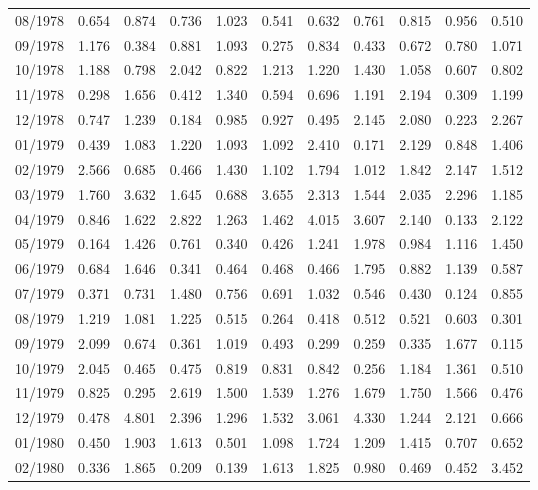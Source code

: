 \begin{tabular}{lrrrrrrrrrr}
08/1978 &  0.654 &  0.874 &  0.736 &  1.023 &  0.541 &  0.632 &  0.761 &  0.815 &  0.956 &  0.510 \\
09/1978 &  1.176 &  0.384 &  0.881 &  1.093 &  0.275 &  0.834 &  0.433 &  0.672 &  0.780 &  1.071 \\
10/1978 &  1.188 &  0.798 &  2.042 &  0.822 &  1.213 &  1.220 &  1.430 &  1.058 &  0.607 &  0.802 \\
11/1978 &  0.298 &  1.656 &  0.412 &  1.340 &  0.594 &  0.696 &  1.191 &  2.194 &  0.309 &  1.199 \\
12/1978 &  0.747 &  1.239 &  0.184 &  0.985 &  0.927 &  0.495 &  2.145 &  2.080 &  0.223 &  2.267 \\
01/1979 &  0.439 &  1.083 &  1.220 &  1.093 &  1.092 &  2.410 &  0.171 &  2.129 &  0.848 &  1.406 \\
02/1979 &  2.566 &  0.685 &  0.466 &  1.430 &  1.102 &  1.794 &  1.012 &  1.842 &  2.147 &  1.512 \\
03/1979 &  1.760 &  3.632 &  1.645 &  0.688 &  3.655 &  2.313 &  1.544 &  2.035 &  2.296 &  1.185 \\
04/1979 &  0.846 &  1.622 &  2.822 &  1.263 &  1.462 &  4.015 &  3.607 &  2.140 &  0.133 &  2.122 \\
05/1979 &  0.164 &  1.426 &  0.761 &  0.340 &  0.426 &  1.241 &  1.978 &  0.984 &  1.116 &  1.450 \\
06/1979 &  0.684 &  1.646 &  0.341 &  0.464 &  0.468 &  0.466 &  1.795 &  0.882 &  1.139 &  0.587 \\
07/1979 &  0.371 &  0.731 &  1.480 &  0.756 &  0.691 &  1.032 &  0.546 &  0.430 &  0.124 &  0.855 \\
08/1979 &  1.219 &  1.081 &  1.225 &  0.515 &  0.264 &  0.418 &  0.512 &  0.521 &  0.603 &  0.301 \\
09/1979 &  2.099 &  0.674 &  0.361 &  1.019 &  0.493 &  0.299 &  0.259 &  0.335 &  1.677 &  0.115 \\
10/1979 &  2.045 &  0.465 &  0.475 &  0.819 &  0.831 &  0.842 &  0.256 &  1.184 &  1.361 &  0.510 \\
11/1979 &  0.825 &  0.295 &  2.619 &  1.500 &  1.539 &  1.276 &  1.679 &  1.750 &  1.566 &  0.476 \\
12/1979 &  0.478 &  4.801 &  2.396 &  1.296 &  1.532 &  3.061 &  4.330 &  1.244 &  2.121 &  0.666 \\
01/1980 &  0.450 &  1.903 &  1.613 &  0.501 &  1.098 &  1.724 &  1.209 &  1.415 &  0.707 &  0.652 \\
02/1980 &  0.336 &  1.865 &  0.209 &  0.139 &  1.613 &  1.825 &  0.980 &  0.469 &  0.452 &  3.452 \\

\end{tabular}
